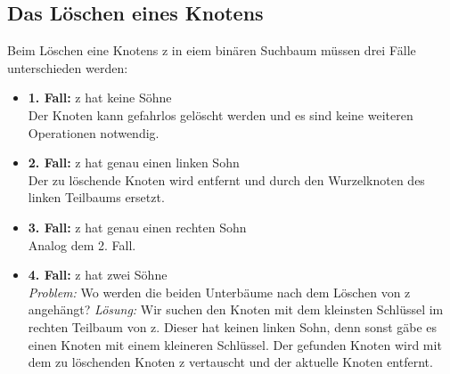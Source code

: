 \documentclass[ngerman,draft,parskip=half*,twoside]{scrreprt}
\theoremstyle{break}
\begin{document}
\subsection{Das Löschen eines Knotens}
	Beim Löschen eine Knotens z in eiem binären Suchbaum müssen drei Fälle
	unterschieden werden:\
	\begin{itemize}
	 	\item \textbf{1. Fall:} z hat keine Söhne \\
	 	Der Knoten kann gefahrlos gelöscht werden und es sind
	 	keine weiteren Operationen notwendig.
	 	\centering
	 		
	 	 
	 	\item \textbf{2. Fall:} z hat genau einen linken Sohn \\
	 	Der zu löschende Knoten wird entfernt und durch den Wurzelknoten
	 	des linken Teilbaums ersetzt.
	 	\centering
	 		
	 	
	 	\item \textbf{3. Fall:} z hat genau einen rechten Sohn \\
		  Analog dem 2. Fall.
		\item \textbf{4. Fall:} z hat zwei Söhne \\
		\textit{Problem:} Wo werden die beiden Unterbäume nach dem Löschen von z
		angehängt?
		\textit{Lösung:} Wir suchen den Knoten mit dem kleinsten Schlüssel im rechten
		Teilbaum von z. Dieser hat keinen linken Sohn, denn sonst gäbe es einen
		Knoten mit einem kleineren Schlüssel. Der gefunden Knoten wird mit dem
		zu löschenden Knoten z vertauscht und der aktuelle Knoten entfernt.
	 	\centering
	 		
	 	
		\end{itemize}		 		
\end{document}
